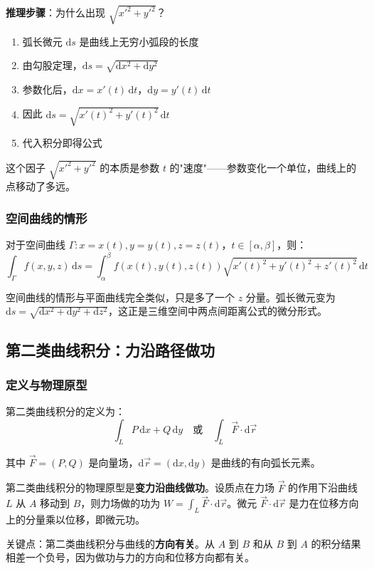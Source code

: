 \begin{insightbox}
\textbf{推理步骤}：为什么出现 $\sqrt{x'^2+y'^2}$？
\begin{enumerate}[leftmargin=2em]
    \item 弧长微元 $\mathrm{d}s$ 是曲线上无穷小弧段的长度
    \item 由勾股定理，$\mathrm{d}s = \sqrt{\mathrm{d}x^2+\mathrm{d}y^2}$
    \item 参数化后，$\mathrm{d}x = x'(t)\,\mathrm{d}t$，$\mathrm{d}y = y'(t)\,\mathrm{d}t$
    \item 因此 $\mathrm{d}s = \sqrt{x'(t)^2+y'(t)^2}\,\mathrm{d}t$
    \item 代入积分即得公式
\end{enumerate}
这个因子 $\sqrt{x'^2+y'^2}$ 的本质是参数 $t$ 的"速度"——参数变化一个单位，曲线上的点移动了多远。
\end{insightbox}

\subsubsection{空间曲线的情形}

对于空间曲线 $\Gamma: x=x(t), y=y(t), z=z(t)$，$t\in[\alpha,\beta]$，则：
\[
\int_\Gamma f(x,y,z)\,\mathrm{d}s = \int_\alpha^\beta f(x(t),y(t),z(t))\sqrt{x'(t)^2+y'(t)^2+z'(t)^2}\,\mathrm{d}t
\]

空间曲线的情形与平面曲线完全类似，只是多了一个 $z$ 分量。弧长微元变为 $\mathrm{d}s = \sqrt{\mathrm{d}x^2+\mathrm{d}y^2+\mathrm{d}z^2}$，这正是三维空间中两点间距离公式的微分形式。

\subsection{第二类曲线积分：力沿路径做功}

\subsubsection{定义与物理原型}

第二类曲线积分的定义为：
\[
\int_L P\,\mathrm{d}x + Q\,\mathrm{d}y \quad \text{或} \quad \int_L \vec{F}\cdot\mathrm{d}\vec{r}
\]

其中 $\vec{F} = (P, Q)$ 是向量场，$\mathrm{d}\vec{r} = (\mathrm{d}x, \mathrm{d}y)$ 是曲线的有向弧长元素。

\begin{essencebox}
第二类曲线积分的物理原型是\textbf{变力沿曲线做功}。设质点在力场 $\vec{F}$ 的作用下沿曲线 $L$ 从 $A$ 移动到 $B$，则力场做的功为 $W = \int_L \vec{F}\cdot\mathrm{d}\vec{r}$。微元 $\vec{F}\cdot\mathrm{d}\vec{r}$ 是力在位移方向上的分量乘以位移，即微元功。

关键点：第二类曲线积分与曲线的\textbf{方向有关}。从 $A$ 到 $B$ 和从 $B$ 到 $A$ 的积分结果相差一个负号，因为做功与力的方向和位移方向都有关。
\end{essencebox}

